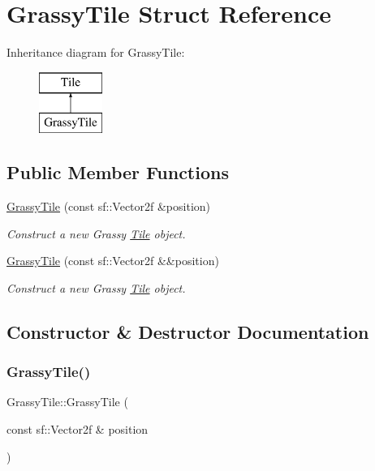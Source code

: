 \hypertarget{structGrassyTile}{}\section{Grassy\+Tile Struct Reference}
\label{structGrassyTile}
Inheritance diagram for Grassy\+Tile\+:\begin{figure}[H]
\begin{center}
\leavevmode
\includegraphics[height=2.000000cm]{structGrassyTile}
\end{center}
\end{figure}
\subsection*{Public Member Functions}
\begin{DoxyCompactItemize}
\item 
\mbox{\hyperlink{structGrassyTile_af97dac68cb91fc462274d16d85e20e92}{Grassy\+Tile}} (const sf\+::\+Vector2f \&position)
\begin{DoxyCompactList}\small\item\em Construct a new Grassy \mbox{\hyperlink{classTile}{Tile}} object. \end{DoxyCompactList}\item 
\mbox{\hyperlink{structGrassyTile_acd1aa8c780a09b87e0bb4b39a435c536}{Grassy\+Tile}} (const sf\+::\+Vector2f \&\&position)
\begin{DoxyCompactList}\small\item\em Construct a new Grassy \mbox{\hyperlink{classTile}{Tile}} object. \end{DoxyCompactList}\end{DoxyCompactItemize}


\subsection{Constructor \& Destructor Documentation}
\mbox{\label{structGrassyTile_af97dac68cb91fc462274d16d85e20e92}} 
\subsubsection{\texorpdfstring{GrassyTile()}{GrassyTile()}\hspace{0.1cm}{\footnotesize\ttfamily [1/2]}}
{\footnotesize\ttfamily Grassy\+Tile\+::\+Grassy\+Tile (\begin{DoxyParamCaption}\item[{const sf\+::\+Vector2f \&}]{position }\end{DoxyParamCaption})\hspace{0.3cm}{\ttfamily [explicit]}}



